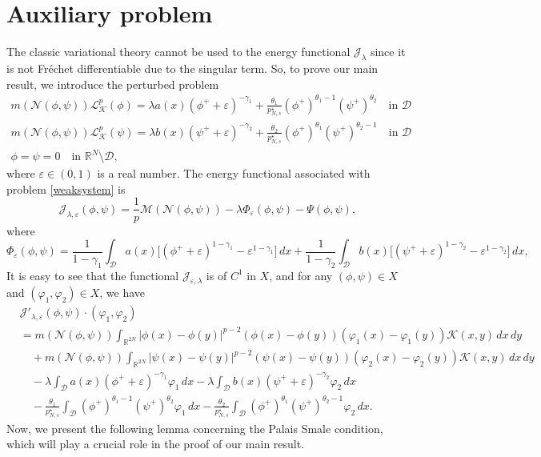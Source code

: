 \documentclass[reqno]{amsart}
\begin{document}
\section{Auxiliary problem}
The classic variational theory cannot be used to the energy functional 
$\mathcal{J}_\lambda$ since it is not Fr\'echet differentiable due to the singular term. 
So, to prove our main result, we introduce the perturbed problem
\begin{equation}\label{weaksystem}
\begin{gathered}
m(\mathcal{N}(\phi,\psi))\mathcal{L}_\mathcal{K}^p(\phi)=\lambda a(x)(\phi^+
 +\varepsilon)^{-\gamma_1}+\frac{\theta_1}{p^\star_{N,s}}(\phi^+)^{\theta_1-1}
 (\psi^+)^{\theta_2} \quad \text{in } \mathcal{D} \\
m(\mathcal{N}(\phi,\psi))\mathcal{L}_\mathcal{K}^p(\psi)=\lambda b(x)(\psi^+
 +\varepsilon)^{-\gamma_2}+\frac{\theta_2}{p^\star_{N,s}}(\phi^+)^{\theta_1}
 (\psi^+)^{\theta_2-1} \quad \text{in } \mathcal{D} \\
\phi=\psi=0 \quad \text{in } \mathbb{R}^N\setminus \mathcal{D},
\end{gathered}
\end{equation}
where $\varepsilon\in (0,1)$ is a real number. The energy functional associated with 
problem \eqref{weaksystem} is 
$$
\mathcal{J}_{\lambda,\varepsilon}(\phi,\psi)
=\frac{1}{p}\mathscr{M}(\mathcal{N}(\phi,\psi))
-\lambda \Phi_\varepsilon(\phi,\psi)-\Psi(\phi,\psi),
$$
where
$$
\Phi_\varepsilon(\phi,\psi)=\frac{1}{1-\gamma_1}\int_\mathcal{D} a(x)\Big[(\phi^+
+\varepsilon)^{1-\gamma_1}-\varepsilon^{1-\gamma_1}\Big]\,dx
+\frac{1}{1-\gamma_2}\int_\mathcal{D}b(x)\Big[(\psi^+
+\varepsilon)^{1-\gamma_2}-\varepsilon^{1-\gamma_2}\Big]\,dx,
$$
It is easy to see that the functional $\mathcal{J}_{\varepsilon,\lambda}$ is of 
$C^1$ in $X$, and for any $(\phi,\psi)\in X$ and $(\varphi_1,\varphi_2)\in X$, we have
\begin{equation} \label{p11}
\begin{aligned}
&\mathcal{J}'_{\lambda,\varepsilon}(\phi,\psi)\cdot (\varphi_1,\varphi_2) \\
&=m(\mathcal{N}(\phi,\psi))\int_{\mathbb{R}^{2N}}|\phi(x)-\phi(y)|^{p-2}(\phi(x)-\phi(y))
 (\varphi_1(x)-\varphi_1(y))\mathcal{K}(x,y)\,dx\,dy \\
&\quad +m(\mathcal{N}(\phi,\psi))\int_{\mathbb{R}^{2N}}|\psi(x)-\psi(y)|^{p-2}(\psi(x)-\psi(y))
 (\varphi_2(x)-\varphi_2(y))\mathcal{K}(x,y)\,dx\,dy \\
&\quad -\lambda \int_\mathcal{D} a(x)(\phi^++\varepsilon)^{-\gamma_1}\varphi_1\,dx
 -\lambda\int_\mathcal{D}b(x)(\psi^++\varepsilon)^{-\gamma_2}\varphi_2\,dx  \\
&\quad -\frac{\theta_1}{p^\star_{N,s}}\int_\mathcal{D}(\phi^+)^{\theta_1-1}
(\psi^+)^{\theta_2}\varphi_1\,dx-\frac{\theta_2}{p^\star_{N,s}}
\int_\mathcal{D}(\phi^+)^{\theta_1}(\psi^+)^{\theta_2-1}\varphi_2\,dx.
\end{aligned}
\end{equation}
Now, we present the following lemma concerning the Palais Smale condition, which will
play a crucial role in the proof of our main result.
\end{document}
